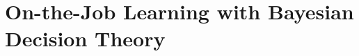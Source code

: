 
\chapter{\label{chap:otj} On-the-Job Learning with Bayesian Decision Theory}
\usetikzlibrary{positioning}



%
%



%

%
%



